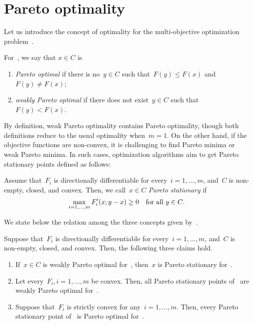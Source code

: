 \documentclass[../main]{subfiles}
\begin{document}
\section{Pareto optimality}
Let us introduce the concept of optimality for the multi-objective optimization problem~.
\begin{definition} 
    For~, we say that $x \in C$ is
    \begin{enumerate}
        \item \emph{Pareto optimal} if there is no~$y \in C$ such that~$F(y) \le F(x)$ and~$F(y) \neq F(x)$; 
        \item \emph{weakly Pareto optimal} if there does not exist~$y \in C$ such that~$F(y) < F(x)$. 
    \end{enumerate}
\end{definition}
By definition, weak Pareto optimality contains Pareto optimality, though both definitions reduce to the usual optimality when~$m = 1$.
On the other hand, if the objective functions are non-convex, it is challenging to find Pareto minima or weak Pareto minima.
In such cases, optimization algorithms aim to get Pareto stationary points defined as follows:
\begin{definition} 
    Assume that~$F_i$ is directionally differentiable for every~$i = 1, \dots, m$, and~$C$ is non-empty, closed, and convex.
    Then, we call~$x \in C$ \emph{Pareto stationary} if~
    \begin{equation}
        \max_{i = 1, \dots, m} F_i'(x; y - x) \ge 0 \quad \text{for all~$y \in C$}
        .\end{equation}
\end{definition}
We state below the relation among the three concepts given by~.
\begin{lemma} 
    Suppose that~$F_i$ is directionally differentiable for every~$i = 1, \dots, m$, and~$C$ is non-empty, closed, and convex.
    Then, the following three claims hold.
    \begin{enumerate}
        \item If~$x \in C$ is weakly Pareto optimal for~, then~$x$ is Pareto stationary for~. 
        \item Let every~$F_i, i = 1, \dots, m$ be convex. Then, all Pareto stationary points of~ are weakly Pareto optimal for~. 
        \item Suppose that~$F_i$ is strictly convex for any~$i = 1, \dots, m$. Then, every Pareto stationary point of~ is Pareto optimal for~. 
    \end{enumerate}
\end{lemma}
\end{document}
